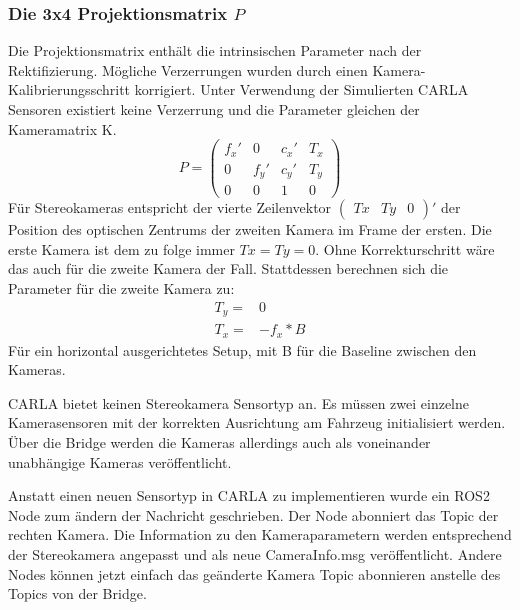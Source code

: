 \subsubsection*{Die 3x4 Projektionsmatrix $P$}
Die Projektionsmatrix enthält die intrinsischen Parameter nach der Rektifizierung. Mögliche Verzerrungen wurden durch einen Kamera-Kalibrierungsschritt korrigiert. Unter Verwendung der Simulierten CARLA Sensoren existiert keine Verzerrung und die Parameter gleichen der Kameramatrix K.
\begin{displaymath}
P = 
\begin{pmatrix}
f_{x}' & 0 & c_{x}' & T_{x}\\
0 & f_{y}' & c_{y}' & T_{y}\\
0 & 0 & 1 & 0
\end{pmatrix}
\end{displaymath}
Für Stereokameras entspricht der vierte Zeilenvektor $\left(\begin{smallmatrix}Tx & Ty & 0\end{smallmatrix}\right)'$ der Position des optischen Zentrums der zweiten Kamera im Frame der ersten. Die erste Kamera ist dem zu folge immer $Tx = Ty = 0$. Ohne Korrekturschritt wäre das auch für die zweite Kamera der Fall. Stattdessen berechnen sich die Parameter für die zweite Kamera zu:
\begin{align*}
T_{y}=& 0\\
T_{x}=&-f_{x} * B
\end{align*}
Für ein horizontal ausgerichtetes Setup, mit B für die Baseline zwischen den Kameras.
\newline 


CARLA bietet keinen Stereokamera Sensortyp an. Es müssen zwei einzelne Kamerasensoren mit der korrekten Ausrichtung am Fahrzeug initialisiert werden. Über die Bridge werden die Kameras allerdings auch als voneinander unabhängige Kameras veröffentlicht. 

Anstatt einen neuen Sensortyp in CARLA zu implementieren wurde ein ROS2 Node zum ändern der Nachricht geschrieben. Der Node abonniert das Topic der rechten Kamera. Die Information zu den Kameraparametern werden entsprechend der Stereokamera angepasst und als neue CameraInfo.msg veröffentlicht. Andere Nodes können jetzt einfach das geänderte Kamera Topic abonnieren anstelle des Topics von der Bridge.

%
